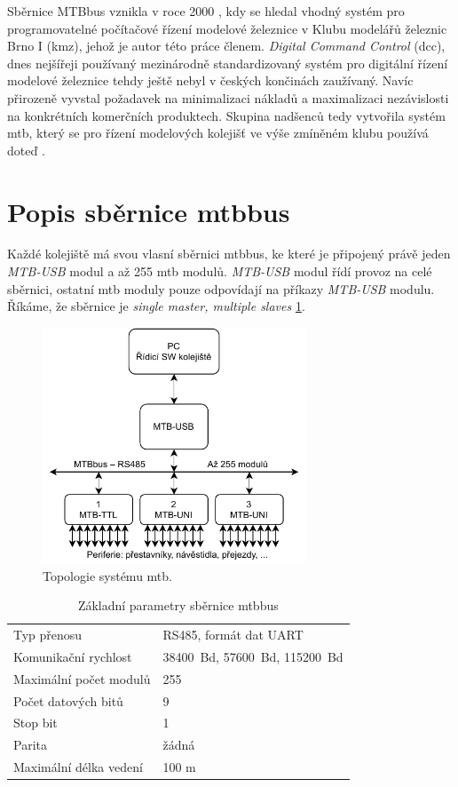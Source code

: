 Sběrnice MTBbus vznikla v roce 2000 \cite{mtb:web}, kdy se hledal vhodný systém
pro programovatelné počítačové řízení modelové železnice v Klubu modelářů
železnic Brno I (\gls{kmz}), jehož je autor této práce členem.
\textit{Digital Command Control} (\gls{dcc}), dnes nejšířeji používaný
mezinárodně standardizovaný systém pro digitální řízení modelové železnice
\cite{dcc_intro:web} tehdy ještě nebyl v českých končinách zaužívaný. Navíc
přirozeně vyvstal požadavek na minimalizaci nákladů a maximalizaci nezávislosti
na konkrétních komerčních produktech. Skupina nadšenců tedy vytvořila systém
\gls{mtb}, který se pro řízení modelových kolejišť ve výše zmíněném klubu
používá doteď \cite{kmz_rizeni:web}.

\section{Popis sběrnice \gls{mtbbus}} \label{sec:mtbbus}

Každé kolejiště má svou vlasní sběrnici \gls{mtbbus}, ke které je připojený
právě jeden \textit{MTB-USB} modul a až 255 \gls{mtb} modulů. \textit{MTB-USB}
modul řídí provoz na celé sběrnici, ostatní \gls{mtb} moduly pouze odpovídají
na příkazy \textit{MTB-USB} modulu. Říkáme, že sběrnice je \textit{single
master, multiple slaves} \ref{fig:mtbbus-topology}.

\begin{figure}[ht]
\includegraphics[width=0.7\textwidth]{data/mtb-topology.pdf}
\caption{Topologie systému \gls{mtb}.}
\label{fig:mtbbus-topology}
\end{figure}

\begin{table}[h]
	\begin{tabularx}{\textwidth}{XX}
		\toprule
		Typ přenosu & RS485, formát dat UART \\
		Komunikační rychlost & 38400~Bd, 57600~Bd, 115200~Bd \\
		Maximální počet modulů & 255 \\
		Počet datových bitů & 9 \\
		Stop bit & 1 \\
		Parita & žádná \\
		Maximální délka vedení & 100 m \\
		\bottomrule
	\end{tabularx}
	\caption{Základní parametry sběrnice \gls{mtbbus}}
	\label{tab:mtbbus-params}
\end{table}

